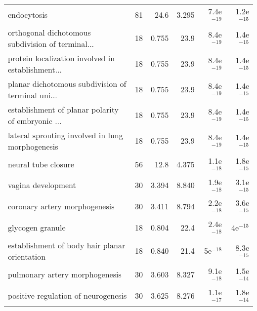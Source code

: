 \begin{longtable}{lrrrrr}
                                       endocytosis &                      81 &                    24.6 &      3.295 &         7.4e$^{-19}$ &         1.2e$^{-15}$ \\
 orthogonal dichotomous subdivision of terminal... &                      18 &                   0.755 &       23.9 &         8.4e$^{-19}$ &         1.4e$^{-15}$ \\
 protein localization involved in establishment... &                      18 &                   0.755 &       23.9 &         8.4e$^{-19}$ &         1.4e$^{-15}$ \\
 planar dichotomous subdivision of terminal uni... &                      18 &                   0.755 &       23.9 &         8.4e$^{-19}$ &         1.4e$^{-15}$ \\
 establishment of planar polarity of embryonic ... &                      18 &                   0.755 &       23.9 &         8.4e$^{-19}$ &         1.4e$^{-15}$ \\
  lateral sprouting involved in lung morphogenesis &                      18 &                   0.755 &       23.9 &         8.4e$^{-19}$ &         1.4e$^{-15}$ \\
                               neural tube closure &                      56 &                    12.8 &      4.375 &         1.1e$^{-18}$ &         1.8e$^{-15}$ \\
                                vagina development &                      30 &                   3.394 &      8.840 &         1.9e$^{-18}$ &         3.1e$^{-15}$ \\
                     coronary artery morphogenesis &                      30 &                   3.411 &      8.794 &         2.2e$^{-18}$ &         3.6e$^{-15}$ \\
                                  glycogen granule &                      18 &                   0.804 &       22.4 &         2.4e$^{-18}$ &           4e$^{-15}$ \\
     establishment of body hair planar orientation &                      18 &                   0.840 &       21.4 &           5e$^{-18}$ &         8.3e$^{-15}$ \\
                    pulmonary artery morphogenesis &                      30 &                   3.603 &      8.327 &         9.1e$^{-18}$ &         1.5e$^{-14}$ \\
               positive regulation of neurogenesis &                      30 &                   3.625 &      8.276 &         1.1e$^{-17}$ &         1.8e$^{-14}$ \\

\end{longtable}
